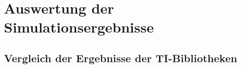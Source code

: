 
\chapter{Auswertung der Simulationsergebnisse}
\label{cha:auswertung}


\section{Vergleich der Ergebnisse der TI-Bibliotheken}\label{sec:vergleich}




